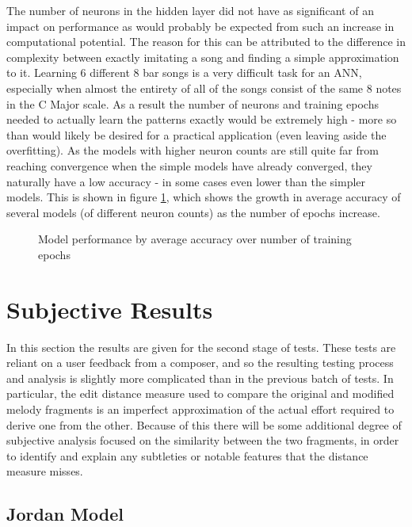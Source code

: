 \documentclass[ author={Stephen Livermore-Tozer},
				supervisor={Dr. Peter Flach},
				degree={MEng},
				title={Algorithmic Co-composition Using Machine Learning},
				subtitle={},
				type={research},
				year={2016} ]{dissertation}
\begin{document}
	The number of neurons in the hidden layer did not have as significant of an impact on performance as would probably be expected from such an increase in computational potential. The reason for this can be attributed to the difference in complexity between exactly imitating a song and finding a simple approximation to it. Learning 6 different 8 bar songs is a very difficult task for an ANN, especially when almost the entirety of all of the songs consist of the same 8 notes in the C Major scale. As a result the number of neurons and training epochs needed to actually learn the patterns exactly would be extremely high - more so than would likely be desired for a practical application (even leaving aside the overfitting). As the models with higher neuron counts are still quite far from reaching convergence when the simple models have already converged, they naturally have a low accuracy - in some cases even lower than the simpler models. This is shown in figure \ref{fig:elman-neurons-epochs-gradient}, which shows the growth in average accuracy of several models (of different neuron counts) as the number of epochs increase.
	
	\begin{figure}[h]
		\centering
		\caption{Model performance by average accuracy over number of training epochs}
		\label{fig:elman-neurons-epochs-gradient}
	\end{figure}
	
	\section{Subjective Results}
	
	In this section the results are given for the second stage of tests. These tests are reliant on a user feedback from a composer, and so the resulting testing process and analysis is slightly more complicated than in the previous batch of tests. In particular, the edit distance measure used to compare the original and modified melody fragments is an imperfect approximation of the actual effort required to derive one from the other. Because of this there will be some additional degree of subjective analysis focused on the similarity between the two fragments, in order to identify and explain any subtleties or notable features that the distance measure misses. 
	
	\subsection{Jordan Model}
	
\end{document}
